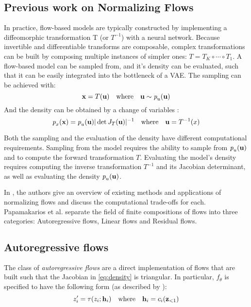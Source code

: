 \documentclass[english]{scrartcl}
\begin{document}
    \subsection{Previous work on Normalizing Flows}
    In practice, flow-based models are typically constructed by implementing a diffeomorphic transformation T (or $T^{-1}$) with a neural network.
    Because invertible and differentiable transforms are composable, complex transformations can be built by composing multiple instances of simpler ones: $T=T_K \circ \cdots \circ T_1$.
    A flow-based model can be sampled from, and it's density can be evaluated, such that it can be easily integrated into the bottleneck of a VAE.
    The sampling can be achieved with:
    \begin{equation}
        \textbf{x} = T(\textbf{u}) \quad \text{where} \quad \textbf{u} \sim \textit{p}_u (\textbf{u})
    \end{equation}
    And the density can be obtained by a change of variables \parencite{bogachev2007measure}:
    \begin{equation}
        \label{eq:density}
        \textit{p}_x (\textbf{x}) = \textit{p}_u (\textbf{u}) |\det J_T(\textbf{u})|^{-1} \quad \text{where} \quad \textbf{u} = T^{-1}(x)
    \end{equation}

    Both the sampling and the evaluation of the density have different computational requirements.
    Sampling from the model requires the ability to sample from $\textit{p}_u (\textbf{u})$ and to compute the forward transformation $T$.
    Evaluating the model's density requires computing the inverse transformation $T^{-1}$ and its Jacobian determinant, as well as evaluating the density $\textit{p}_u (\textbf{u})$.

    In \cite{papamakarios_normalizing_2019}, the authors give an overview of existing methods and applications of normalizing flows and discuss the computational trade-offs for each.
    Papamakarios et al. separate the field of finite compositions of flows into three categories: Autoregressive flows, Linear flows and Residual flows.

    \subsection{Autoregressive flows}
    The class of \textit{autoregressive flows} are a direct implementation of flows that are built such that the Jacobian in \cref{eq:density} is triangular.
    In particular, $f_{\theta}$ is specified to have the following form (as described by \cite{papamakarios_normalizing_2019}):
    \begin{equation}
        z_i^{\prime} = \tau(z_i;\textbf{h}_i) \quad \text{where} \quad \textbf{h}_i = c_i(\textbf{z}_{<1})
    \end{equation}
\end{document}
